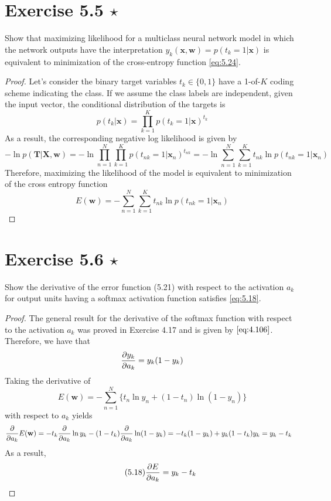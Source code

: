 \section*{Exercise 5.5 $\star$}
Show that maximizing likelihood for a multiclass neural network
model in which the network outputs have the interpretation
$y_k(\mathbf{x}, \mathbf{w}) = p(t_k = 1 | \mathbf{x})$ is equivalent to minimization
of the cross-entropy function \eqref{eq:5.24}.

\vspace{1em}

\begin{proof}
    Let's consider the binary target variables $t_k \in \{0, 1\}$ have a 1-of-$K$ 
    coding scheme indicating the class. If we assume the class labels are independent, 
    given the input vector, the conditional distribution of the targets is
    \[
        p(t_k | \mathbf{x}) = \prod_{k=1}^K p(t_k = 1 | \mathbf{x})^{t_k}
    \] 
    As a result, the corresponding negative log likelihood is given by
    \[
        -\ln p(\mathbf{T} | \mathbf{X}, \mathbf{w})
        = -\ln \prod_{n=1}^N \prod_{k=1}^K p(t_{nk} = 1 | \mathbf{x}_n)^{t_{nk}}
        = -\ln \sum_{n=1}^{N} \sum_{k=1}^{K} t_{nk} \ln p(t_{nk} = 1 | \mathbf{x}_n) 
    \]
    Therefore, maximizing the likelihood of the model is equivalent to minimization
    of the cross entropy function
    \begin{equation}\label{eq:5.24}\tag{5.24}
        E(\mathbf{w}) 
        = -\sum_{n=1}^{N} \sum_{k=1}^{K} t_{nk} \ln p(t_{nk} = 1 | \mathbf{x}_n) 
    \end{equation}
\end{proof}

\section*{Exercise 5.6 $\star$}
Show the derivative of the error function (5.21) with respect
to the activation $a_k$ for output units having a softmax activation
function satisfies \eqref{eq:5.18}.

\vspace{1em}

\begin{proof}
    The general result for the derivative of the softmax function with respect to the 
    activation $a_k$ was proved in Exercise 4.17 and is given by $\eqref{eq:4.106}$.
    Therefore, we have that
    \[
        \pdv{y_k}{a_k} = y_k(1 - y_k)
    \] 
    Taking the derivative of 
    \begin{equation}\label{eq:5.21}\tag{5.21}
        E(\mathbf{w}) = -\sum_{n=1}^{N} \{t_n \ln y_n + (1 - t_n) \ln(1 - y_n)\}
    \end{equation}
    with respect to $a_k$ yields
    \begin{align*}
        \pdv{a_k} E(\mathbf{w}) &= -t_k \pdv{a_k} \ln y_k - (1 - t_k) \pdv{a_k} \ln(1 - y_k) 
        = -t_k(1 - y_k) + y_k(1 - t_k)y_k 
        = y_k - t_k
    \end{align*}
    As a result,
    \begin{equation}\label{eq:5.18}\tag{5.18}
        \pdv{E}{a_k} = y_k - t_k
    \end{equation}
\end{proof}
